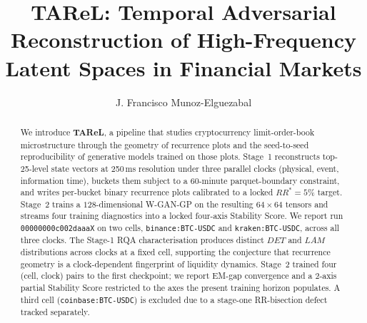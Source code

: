 \documentclass{tex-article}
\title{TAReL: Temporal Adversarial Reconstruction of High-Frequency
       Latent Spaces in Financial Markets}
\author[1]{J. Francisco Munoz-Elguezabal}
\affil[1]{ITESO --- The Jesuit University of Guadalajara}
\date{}
\begin{document}
\maketitle

\begin{abstract}
We introduce \textbf{TAReL}, a pipeline that studies cryptocurrency
limit-order-book microstructure through the geometry of recurrence
plots and the seed-to-seed reproducibility of generative models
trained on those plots. Stage~1 reconstructs top-25-level state
vectors at 250\,ms resolution under three parallel clocks (physical,
event, information time), buckets them subject to a 60-minute
parquet-boundary constraint, and writes per-bucket binary recurrence
plots calibrated to a locked $RR^{*}{=}5\%$ target. Stage~2 trains a
$128$-dimensional W-GAN-GP on the resulting $64{\times}64$ tensors
and streams four training diagnostics into a locked four-axis
Stability Score. We report run \texttt{00000000c002daaaX} on two
cells, \texttt{binance:BTC-USDC} and \texttt{kraken:BTC-USDC},
across all three clocks. The Stage-1 RQA characterisation produces
distinct $DET$ and $LAM$ distributions across clocks at a fixed
cell, supporting the conjecture that recurrence geometry is a
clock-dependent fingerprint of liquidity dynamics. Stage~2 trained
four (cell, clock) pairs to the first checkpoint; we report EM-gap
convergence and a 2-axis partial Stability Score restricted to the
axes the present training horizon populates. A third cell
(\texttt{coinbase:BTC-USDC}) is excluded due to a stage-one
RR-bisection defect tracked separately.
\end{abstract}










\printbibliography
\end{document}
